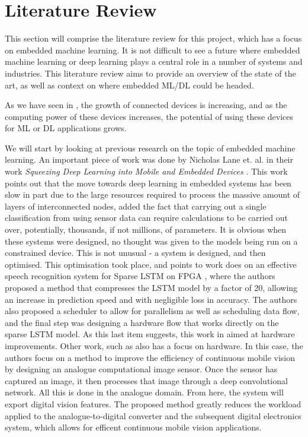 \documentclass[conference]{IEEEtran}
\begin{document}
\section{Literature Review}
This section will comprise the literature review for this project, which has a focus on embedded machine learning. It is not difficult to see a future where embedded machine learning or deep learning plays a central role in a number of systems and industries. This literature review aims to provide an overview of the state of the art, as well as context on where embedded ML/DL could be headed.

As we have seen in \cite{statista1}, the growth of connected devices is increasing, and as the computing power of these devices increases, the potential of using these devices for ML or DL applications grows. 

We will start by looking at previous research on the topic of embedded machine learning. An important piece of work was done by Nicholas Lane et. al. in their work \textit{Squeezing Deep Learning into Mobile and Embedded Devices} \cite{Nicholas_Lane_2017}. This work points out that the move towards deep learning in embedded systems has been slow in part due to the large resources required to process the massive amount of layers of interconnected nodes, added the fact that carrying out a single classification from using sensor data can require calculations to be carried out over, potentially, thousands, if not millions, of parameters. It is obvious when these systems were designed, no thought was given to the models being run on a constrained device. This is not unusual - a system is designed, and then optimised. This optimisation took place, and \cite{Nicholas_Lane_2017} points to work does on an effective speech recognition system for Sparse LSTM on FPGA \cite{han_s_2017}, where the authors proposed a method that compresses the LSTM model by a factor of 20, allowing an increase in prediction speed and with negligible loss in accuracy. The authors also proposed a scheduler to allow for parallelism as well as scheduling data flow, and the final step was designing a hardware flow that works directly on the sparse LSTM model. As this last item suggests, this work in aimed at hardware improvements. Other work, such as \cite{Likamwa2016} also has a focus on hardware. In this case, the authors focus on a method to improve the efficiency of continuous mobile vision by designing an analogue computational image sensor. Once the sensor has captured an image, it then processes that image through a deep convolutional network. All this is done in the analogue domain. From here, the system will export digital vision features. The proposed method greatly reduces the workload applied to the analogue-to-digital converter and the subsequent digital electronics system, which allows for efficent continuous mobile vision applications. 





\printbibliography
\vspace{12pt}
\end{document}
